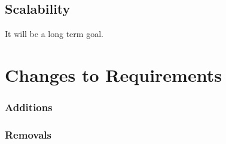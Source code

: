 \subsection{Scalability}
It will be a long term goal.

\section{Changes to Requirements}

\subsubsection{Additions}

\subsubsection{Removals}


\cleardoublepage